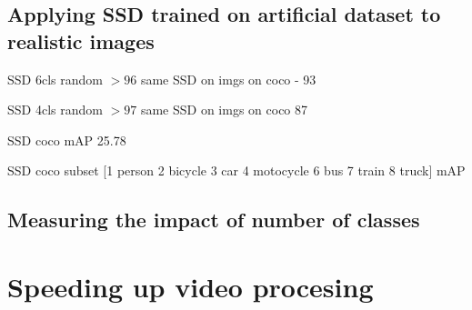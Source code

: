 \subsection{Applying SSD trained on artificial dataset to realistic images}
SSD 6cls random $>96$
same SSD on imgs on coco - 93

SSD 4cls random $>97$
same SSD on imgs on coco 87


SSD coco mAP 25.78

SSD coco subset [1 person
2 bicycle
3 car
4 motocycle
6 bus
7 train
8 truck] mAP

\subsection{Measuring the impact of number of classes}

\section{Speeding up video procesing}